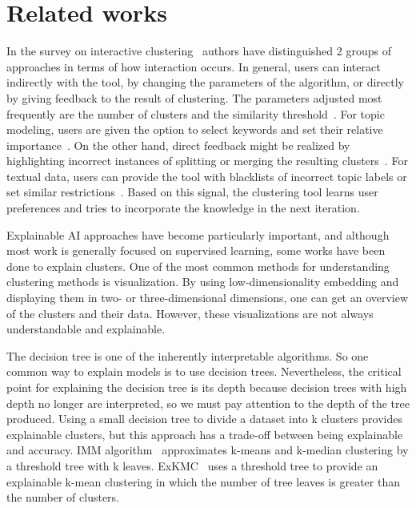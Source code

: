 \documentclass[
 twocolumn,
 hf,
]{ceurart}
\begin{document}
\section{Related works}
\label{sec:sota}

In the survey on interactive clustering~\cite{10.1145/3340960} authors have distinguished 2 groups of approaches in terms of how interaction occurs.
In general, users can interact indirectly with the tool, by changing the parameters of the algorithm, or directly by giving feedback to the result of clustering.
The parameters adjusted most frequently are the number of clusters and the similarity threshold~\cite{10.1007/978-3-319-23461-8_43,10.1016/j.eswa.2017.11.055}.
For topic modeling, users are given the option to select keywords and set their relative importance~\cite{ElAssady2018ProgressiveLO}. %
On the other hand, direct feedback might be realized by highlighting incorrect instances of splitting or merging the resulting clusters~\cite{10.1155/2017/4915828}. %
For textual data, users can provide the tool with blacklists of incorrect topic labels or set similar restrictions~\cite{Chang2016AppGrouperKI}. %
Based on this signal, the clustering tool learns user preferences and tries to incorporate the knowledge in the next iteration.

Explainable AI approaches have become particularly important, and although most work is generally focused on supervised learning, some works have been done to explain clusters.
One of the most common methods for understanding clustering methods is visualization. 
By using low-dimensionality embedding and displaying them in two- or three-dimensional dimensions, one can get an overview of the clusters and their data. 
However, these visualizations are not always understandable and explainable. 

The decision tree is one of the inherently interpretable algorithms. 
So one common way to explain models is to use decision trees. 
Nevertheless, the critical point for explaining the decision tree is its depth because decision trees with high depth no longer are interpreted, so we must pay attention to the depth of the tree produced. 
Using a small decision tree to divide a dataset into k clusters provides explainable clusters, but this approach has a trade-off between being explainable and accuracy. 
IMM algorithm~\cite{dasgupta2020explainable} approximates k-means and k-median clustering by a threshold tree with k leaves.
ExKMC~\cite{frost2020exkmc} uses a threshold tree to provide an explainable k-mean clustering in which the number of tree leaves is greater than the number of clusters.
\end{document}
